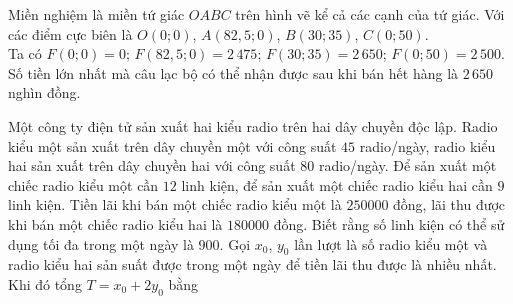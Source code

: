 \begin{ex}[BGD2025]
{\begin{center}
        \end{center}
        Miền nghiệm là miền tứ giác $OABC$	trên hình vẽ kể cả các cạnh của tứ giác. Với các điểm cực biên là 
        $O(0;0)$, $A(82{,}5;0)$, $B(30;35)$, $C(0;50)$.\\
        Ta có $F(0;0)=0$; $F(82{,}5;0)=2\,475$; $F(30;35)=2\,650$; $F(0;50)=2\,500$.\\	
        Số tiền lớn nhất mà câu lạc bộ có thể nhận được sau khi bán hết hàng là 
        $2\,650$ nghìn đồng.		
    }
\end{ex}


\begin{ex}%
    Một công ty điện tử sản xuất hai kiểu radio trên hai dây chuyền độc lập. Radio kiểu một sản xuất trên dây chuyền một với công suất  $45$ radio/ngày, radio kiểu hai sản xuất trên dây chuyền hai với công suất $80$  radio/ngày. Để sản xuất một chiếc radio kiểu một cần $12$  linh kiện, để sản xuất một chiếc radio kiểu hai cần $9$ linh kiện. Tiền lãi khi bán một chiếc radio kiểu một là $250000$  đồng, lãi thu được khi bán một chiếc radio kiểu hai là $180000$ đồng. Biết rằng số linh kiện có thể sử dụng tối đa trong một ngày là $900$. Gọi $x_0$, $y_0$  lần lượt là số radio kiểu một và radio kiểu hai sản suất được trong một ngày để tiền lãi thu được là nhiều nhất. Khi đó tổng $T=x_0+2y_0$  bằng
\end{ex}
